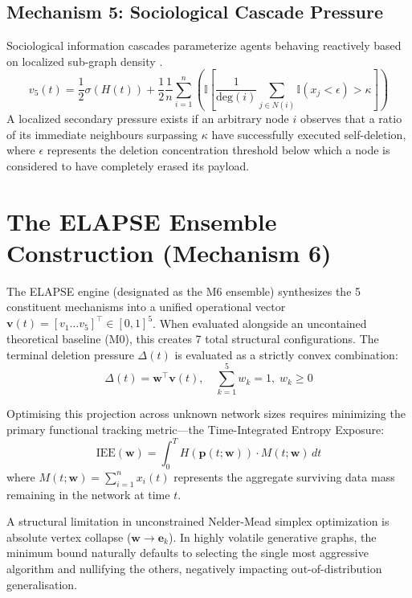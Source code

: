 \documentclass[review,12pt]{elsarticle}
\begin{document}
\subsection{Mechanism 5: Sociological Cascade Pressure}
Sociological information cascades parameterize agents behaving reactively based on localized sub-graph density \cite{watts2002social}.
\begin{equation}
    v_5(t) = \frac{1}{2} \sigma(H(t)) + \frac{1}{2} \frac{1}{n} \sum_{i=1}^n \left( \mathbb{I}\left[ \frac{1}{\text{deg}(i)} \sum_{j \in N(i)} \mathbb{I}(x_j < \epsilon) > \kappa \right] \right)
\end{equation}
A localized secondary pressure exists if an arbitrary node $i$ observes that a ratio of its immediate neighbours surpassing $\kappa$ have successfully executed self-deletion, where $\epsilon$ represents the deletion concentration threshold below which a node is considered to have completely erased its payload.

\section{The ELAPSE Ensemble Construction (Mechanism 6)}
\label{sec:ensemble}

The ELAPSE engine (designated as the M6 ensemble) synthesizes the 5 constituent mechanisms into a unified operational vector $\mathbf{v}(t) = [v_1 \dots v_5]^\top \in [0, 1]^5$. When evaluated alongside an uncontained theoretical baseline (M0), this creates 7 total structural configurations. The terminal deletion pressure $\Delta(t)$ is evaluated as a strictly convex combination:
\begin{equation}
    \Delta(t) = \mathbf{w}^\top \mathbf{v}(t), \quad \sum_{k=1}^5 w_k = 1, \; w_k \ge 0
\end{equation}

Optimising this projection across unknown network sizes requires minimizing the primary functional tracking metric—the Time-Integrated Entropy Exposure:
\begin{equation}
    \text{IEE}(\mathbf{w}) = \int_0^T H(\mathbf{p}(t; \mathbf{w})) \cdot M(t; \mathbf{w}) \, dt
\end{equation}
where $M(t; \mathbf{w}) = \sum_{i=1}^n x_i(t)$ represents the aggregate surviving data mass remaining in the network at time $t$.

A structural limitation in unconstrained Nelder-Mead simplex optimization is absolute vertex collapse ($\mathbf{w} \to \mathbf{e}_k$). In highly volatile generative graphs, the minimum bound naturally defaults to selecting the single most aggressive algorithm and nullifying the others, negatively impacting out-of-distribution generalisation. 
\end{document}
